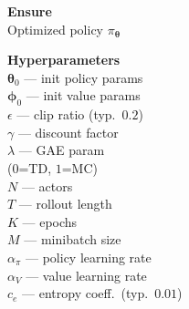 \documentclass[11pt]{article}
\begin{document}
\begin{algorithm}[p]\small
\caption{PPO-Clip (Proximal Policy Optimization)}\label{alg:ppo}
\vspace{2pt}
\noindent
\begin{minipage}[t]{0.28\linewidth}
\renewcommand{\arraystretch}{1.12}
\textbf{Ensure} \\[2pt]
Optimized policy $\pi_{\boldsymbol{\theta}}$

\vspace{6pt}
\textbf{Hyperparameters} \\[2pt]
$\boldsymbol{\theta}_0$ — init policy params \\
$\boldsymbol{\phi}_0$ — init value params \\
$\epsilon$ — clip ratio (typ.\ $0.2$) \\
$\gamma$ — discount factor \\
$\lambda$ — GAE param \\
\hspace*{1em}($0$=TD, $1$=MC) \\
$N$ — actors \\
$T$ — rollout length \\
$K$ — epochs \\
$M$ — minibatch size \\
$\alpha_\pi$ — policy learning rate \\
$\alpha_V$ — value learning rate \\
$c_e$ — entropy coeff.\ (typ.\ $0.01$)


\end{minipage}
\end{algorithm}
\end{document}
